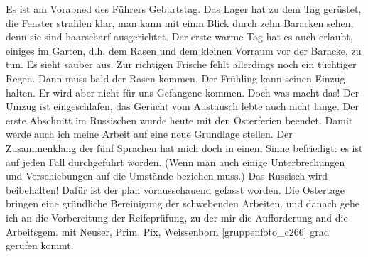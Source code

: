 \def\day{19. April 1943}
\mktitle

Es ist am Vorabned des F\"{u}hrers Geburtstag.
Das Lager hat zu dem Tag ger\"{u}stet, die Fenster strahlen klar, man kann mit einm Blick durch zehn Baracken sehen, denn sie sind haarscharf ausgerichtet.
Der erste warme Tag hat es auch erlaubt, einiges im Garten, d.h. dem Rasen und dem kleinen Vorraum vor der Baracke, zu tun.
Es sieht sauber aus.
Zur richtigen Frische fehlt allerdings noch ein t\"{u}chtiger Regen.
Dann  muss bald der Rasen kommen.
Der Fr\"{u}hling kann seinen Einzug halten.
Er wird aber nicht f\"{u}r uns Gefangene kommen.
Doch was macht das!
Der Umzug ist eingeschlafen, das Ger\"{u}cht vom Austausch lebte auch nicht lange.
Der erste Abschnitt im Russischen wurde heute mit den Osterferien beendet.
Damit werde auch ich meine Arbeit auf eine neue Grundlage stellen.
Der Zusammenklang der f\"{u}nf Sprachen hat mich doch in einem Sinne befriedigt: es ist auf jeden Fall durchgef\"{u}hrt worden.
(Wenn man auch einige Unterbrechungen und Verschiebungen auf die Umst\"{a}nde beziehen muss.)
Das Russisch wird beibehalten!
Daf\"{u}r ist der plan vorausschauend gefasst worden.
Die Ostertage bringen eine gr\"{u}ndliche Bereinigung der schwebenden Arbeiten.
und danach gehe ich an die Vorbereitung der Reifepr\"{u}fung, zu der mir die Aufforderung and die Arbeitsgem. mit Neuser, Prim, Pix, Weissenborn {\color{red} [gruppenfoto{\_}c266] } grad gerufen kommt.


\clearpage
